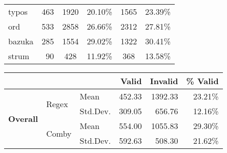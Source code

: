 \documentclass[sigconf,review, anonymous]{acmart}
\newcommand{\mr}[2]{\multirow{#1}{*}{#2}}
\begin{document}
{\begin{table}[hbtp]
\begin{tabularx}{\columnwidth}{X|r|cr|cr}
typos            & 463          & 1920   & 20.10\%  & 1565   & 23.39\% \\
ord              & 533          & 2858   & 26.66\%  & 2312   & 27.81\% \\
bazuka           & 285          & 1554   & 29.02\%  & 1322   & 30.41\% \\
strum            & 90           & 428     & 11.92\% & 368     & 13.58\% \\\bottomrule
\end{tabularx}
\begin{tabularx}{\columnwidth}{Xllrrr}
               & & & \textbf{Valid}  & \textbf{Invalid}  & \textbf{\% Valid} \\\midrule
 \multirow{4}{*}{\textbf{Overall}} & \mr{2}{Regex} & Mean     &  452.33 &  1392.33 & 23.21\% \\
               &   & Std.Dev. & 309.05 & 656.76 & 12.16\%  \\\cline{2-6}
 & \mr{2}{Comby} & Mean     & 554.00 &  1055.83 & 29.30\% \\
               &   & Std.Dev. & 592.63 & 508.30 & 21.62\%  \\\bottomrule
\end{tabularx}
\end{table}


}
\end{document}

